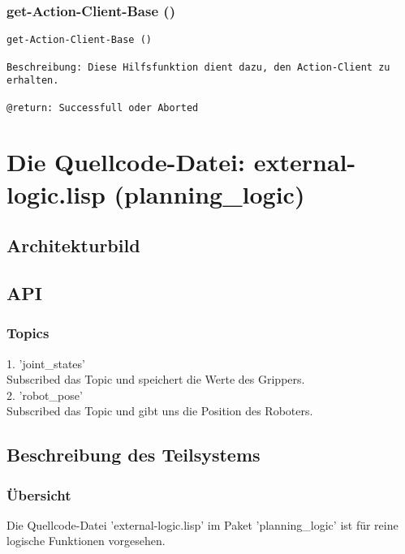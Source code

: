 \documentclass{suturo}
\begin{document}
\subsubsection{get-Action-Client-Base ()}
\begin{verbatim}
get-Action-Client-Base ()

Beschreibung: Diese Hilfsfunktion dient dazu, den Action-Client zu erhalten.

@return: Successfull oder Aborted
\end{verbatim}






\section{Die Quellcode-Datei: external-logic.lisp (planning\_logic)}
\subsection{Architekturbild}


\begin{figure}[!htb]
\end{figure}


\subsection{API}
\subsubsection{Topics}
1. 'joint\_states' \\
Subscribed das Topic und speichert die Werte des Grippers.\\
 
2. 'robot\_pose' \\
Subscribed das Topic und gibt uns die Position des Roboters.
\subsection{Beschreibung des Teilsystems}

\subsubsection{\"Ubersicht}
Die Quellcode-Datei 'external-logic.lisp' im Paket 'planning\_logic' ist für reine logische Funktionen vorgesehen.
\end{document}
